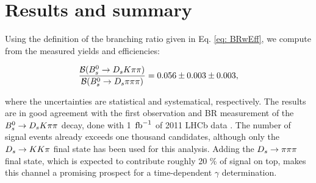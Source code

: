 \section{Results and summary}
\label{sec: results}

Using the definition of the branching ratio given in Eq. \ref{eq: BRwEff}, we compute from the measured yields and efficiencies:

\begin{equation}
\frac{\mathcal{B}({{B}^0_{s}}\rightarrow{\ensuremath{{D}_{s}}}{\ensuremath{K}}{\ensuremath{\pi}}{\ensuremath{\pi}})}{\mathcal{B}({{B}^0_{s}}\rightarrow{\ensuremath{{D}_{s}}}{\ensuremath{\pi}}{\ensuremath{\pi}}{\ensuremath{\pi}})} = 0.056 \pm 0.003 \pm 0.003,
\label{eq: resultBR}
\end{equation}

where the uncertainties are statistical and systematical, respectively. \newline
The results are in good agreement with the first observation and BR measurement of the ${{B}^0_{s}}\rightarrow{\ensuremath{{D}_{s}}}{\ensuremath{K}}{\ensuremath{\pi}}{\ensuremath{\pi}}$ decay, done with 1 $\mbox{\,fb}^{-1}$ of 2011 LHCb data \cite{Blusk:2012it}.  
The number of signal events already exceeds one thousand candidates, although only the ${{D}_{s}}\rightarrow{\ensuremath{K}}{\ensuremath{K}}{\ensuremath{\pi}}$ final state has been used for this analysis. 
Adding the ${{D}_{s}}\rightarrow{\ensuremath{\pi}}{\ensuremath{\pi}}{\ensuremath{\pi}}$ final state, which is expected to contribute roughly 20 $\%$ of signal on top, makes this channel a promising prospect for a time-dependent $\gamma$ determination.

